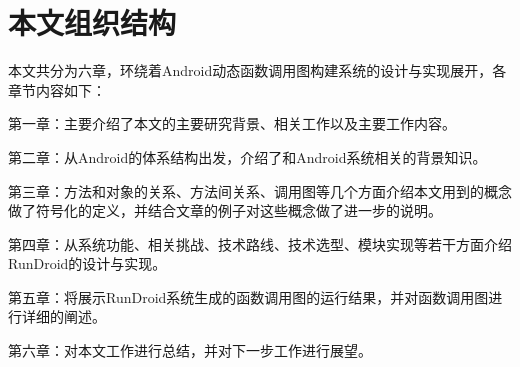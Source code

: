
\section{本文组织结构}

本文共分为六章，环绕着Android动态函数调用图构建系统的设计与实现展开，各章节内容如下：

第一章：主要介绍了本文的主要研究背景、相关工作以及主要工作内容。

第二章：从Android的体系结构出发，介绍了和Android系统相关的背景知识。

第三章：方法和对象的关系、方法间关系、调用图等几个方面介绍本文用到的概念做了符号化的定义，并结合文章的例子对这些概念做了进一步的说明。

第四章：从系统功能、相关挑战、技术路线、技术选型、模块实现等若干方面介绍RunDroid的设计与实现。

第五章：将展示RunDroid系统生成的函数调用图的运行结果，并对函数调用图进行详细的阐述。

第六章：对本文工作进行总结，并对下一步工作进行展望。


